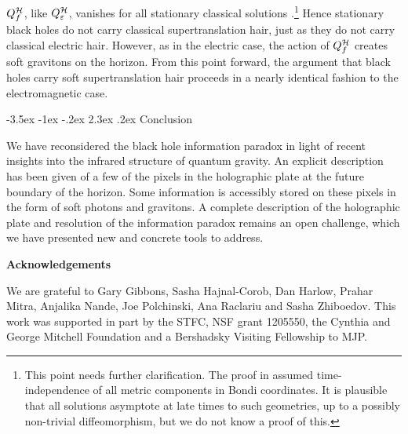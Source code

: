 \documentclass[12pt]{article}
\makeatletter
\numberwithin{equation}{section}
\def\e{{\epsilon}}
\def\ch{{\cal H}}
\renewcommand{\epsilon}{\varepsilon}
\renewcommand\section{\@startsection {section}{1}{\z@}%
                                   {-3.5ex \@plus -1ex \@minus -.2ex}%
                                   {2.3ex \@plus.2ex}%
                                   {\normalfont\large\bfseries}}
\makeatother
\begin{document}
$Q^\ch_f$, like $Q^\ch_\e$,  vanishes for all stationary classical solutions \cite{Flanagan:2015pxa}.\footnote{This point needs further clarification. The proof in \cite{Flanagan:2015pxa} assumed time-independence of all metric components in Bondi coordinates. It is plausible that all solutions asymptote at late times to such geometries, up to a possibly non-trivial diffeomorphism, but we do not know a proof of this.} Hence stationary  black holes do not carry classical supertranslation hair, just as they do not carry classical electric hair. However, as in the electric case, the action of $Q^\ch_f$ 
creates soft gravitons on the horizon.  From this point forward, the argument that black holes carry soft supertranslation hair proceeds in a nearly identical fashion to the electromagnetic case.  




\section{Conclusion}

We have reconsidered the  black hole information paradox in light of recent insights into the infrared structure of quantum gravity. An explicit description has been given of a few of the pixels in the holographic plate at the future boundary of the horizon.  Some information is accessibly stored on these pixels in the form of soft photons and gravitons. A complete description of the holographic plate and resolution of the information paradox remains an open challenge, which we have presented new and concrete tools to address.

  
\bigskip

\centerline{\bf Acknowledgements}
We are grateful to Gary Gibbons, Sasha Hajnal-Corob, Dan Harlow, Prahar Mitra, Anjalika Nande, Joe Polchinski, Ana Raclariu and Sasha Zhiboedov.
This work was supported in part by the STFC, NSF grant 1205550, the Cynthia and George Mitchell Foundation and a Bershadsky Visiting Fellowship to MJP. 
\end{document}
